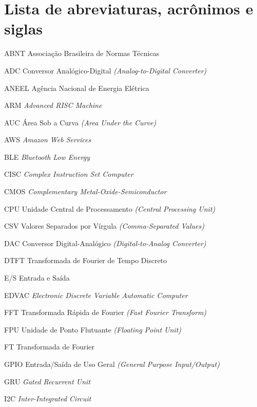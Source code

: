 \chapter*{Lista de abreviaturas, acrônimos e siglas}
\thispagestyle{empty} %
\begin{acronym}
  \item[ABNT] \qquad Associação Brasileira de Normas Técnicas
  \item[ADC] \qquad Conversor Analógico-Digital \textit{(Analog-to-Digital Converter)}
  \item[ANEEL] \qquad Agência Nacional de Energia Elétrica
  \item[ARM] \qquad \textit{Advanced RISC Machine}
  \item[AUC] \qquad Área Sob a Curva \textit{(Area Under the Curve)}
  \item[AWS] \qquad \textit{Amazon Web Services}
  \item[BLE] \qquad \textit{Bluetooth Low Energy}
  \item[CISC] \qquad \textit{Complex Instruction Set Computer}
  \item[CMOS] \qquad \textit{Complementary Metal-Oxide-Semiconductor}
  \item[CPU] \qquad Unidade Central de Processamento \textit{(Central Processing Unit)}
  \item[CSV] \qquad Valores Separados por Vírgula \textit{(Comma-Separated Values)}
  \item[DAC] \qquad Conversor Digital-Analógico \textit{(Digital-to-Analog Converter)}
  \item[DTFT] \qquad Transformada de Fourier de Tempo Discreto
  \item[E/S] \qquad Entrada e Saída
  \item[EDVAC] \qquad \textit{Electronic Discrete Variable Automatic Computer}
  \item[FFT] \qquad Transformada Rápida de Fourier \textit{(Fast Fourier Transform)}
  \item[FPU] \qquad Unidade de Ponto Flutuante \textit{(Floating Point Unit)}
  \item[FT] \qquad Transformada de Fourier
  \item[GPIO] \qquad Entrada/Saída de Uso Geral \textit{(General Purpose Input/Output)}
  \item[GRU] \qquad \textit{Gated Recurrent Unit}
  \item[I2C] \qquad \textit{Inter-Integrated Circuit}

\end{acronym}
